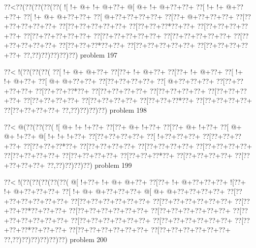 \vbox{\vbox{\goo
\0??<\0??(\0??(\0??(\0??(\0??(
\- ![\- !+\- @+\- !+\- @+\0??+
\- @[\- @+\- !+\- @+\0??+\0??+
\0??[\- !+\- !+\- @+\0??+\0??+
\0??[\- !+\- @+\- @+\0??+\0??+
\0??[\- @+\0??+\0??+\0??+\0??+
\0??[\0??+\- @+\0??+\0??+\0??+
\0??[\0??+\0??+\0??+\0??+\0??+
\0??[\0??+\0??+\0??+\0??+\0??+
\0??[\0??+\0??+\0??*\0??+\0??+
\0??[\0??+\0??+\0??+\0??+\0??+
\0??[\0??+\0??+\0??+\0??+\0??+
\0??[\0??+\0??+\0??+\0??+\0??+
\0??[\0??+\0??+\0??+\0??+\0??+
\0??[\0??+\0??+\0??+\0??+\0??+
\0??[\0??+\0??+\0??*\0??+\0??+
\0??[\0??+\0??+\0??+\0??+\0??+
\0??[\0??+\0??+\0??+\0??+\0??+
\0??,\0??)\0??)\0??)\0??)\0??)
}
\hfil problem 197\hfil\break
}

\vbox{\vbox{\goo
\0??<\- !(\0??(\0??(\0??(
\0??[\- !+\- @+\- @+\0??+
\0??[\0??+\- !+\- @+\0??+
\0??[\0??+\- !+\- @+\0??+
\0??[\- !+\- !+\- @+\0??+
\0??[\- @+\- @+\0??+\0??+
\0??[\0??+\0??+\0??+\0??+
\0??[\- @+\0??+\0??+\0??+
\0??[\0??+\0??+\0??+\0??+
\0??[\0??+\0??+\0??*\0??+
\0??[\0??+\0??+\0??+\0??+
\0??[\0??+\0??+\0??+\0??+
\0??[\0??+\0??+\0??+\0??+
\0??[\0??+\0??+\0??+\0??+
\0??[\0??+\0??+\0??+\0??+
\0??[\0??+\0??+\0??*\0??+
\0??[\0??+\0??+\0??+\0??+
\0??[\0??+\0??+\0??+\0??+
\0??,\0??)\0??)\0??)\0??)
}
\hfil problem 198\hfil\break
}

\vbox{\vbox{\goo
\0??<\- @(\0??(\0??(\0??(
\- ![\- @+\- !+\- !+\0??+
\0??[\0??+\- @+\- !+\0??+
\0??[\0??+\- @+\- !+\0??+
\0??[\- @+\- @+\- !+\0??+
\- @[\- !+\- !+\- !+\0??+
\0??[\0??+\0??+\0??+\0??+
\0??[\- !+\0??+\0??+\0??+
\0??[\0??+\0??+\0??+\0??+
\0??[\0??+\0??+\0??*\0??+
\0??[\0??+\0??+\0??+\0??+
\0??[\0??+\0??+\0??+\0??+
\0??[\0??+\0??+\0??+\0??+
\0??[\0??+\0??+\0??+\0??+
\0??[\0??+\0??+\0??+\0??+
\0??[\0??+\0??+\0??*\0??+
\0??[\0??+\0??+\0??+\0??+
\0??[\0??+\0??+\0??+\0??+
\0??,\0??)\0??)\0??)\0??)
}
\hfil problem 199\hfil\break
}

\vbox{\vbox{\goo
\0??<\- !(\0??(\0??(\0??(\0??(\0??(
\- @[\- !+\0??+\- !+\- @+\- @+\0??+
\0??[\0??+\- !+\- @+\0??+\0??+\0??+
\- ![\0??+\- !+\- @+\0??+\0??+\0??+
\0??[\- !+\- @+\- @+\0??+\0??+\0??+
\- @[\- @+\- @+\0??+\0??+\0??+\0??+
\0??[\0??+\0??+\0??+\0??+\0??+\0??+
\0??[\0??+\0??+\0??+\0??+\0??+\0??+
\0??[\0??+\0??+\0??+\0??+\0??+\0??+
\0??[\0??+\0??+\0??*\0??+\0??+\0??+
\0??[\0??+\0??+\0??+\0??+\0??+\0??+
\0??[\0??+\0??+\0??+\0??+\0??+\0??+
\0??[\0??+\0??+\0??+\0??+\0??+\0??+
\0??[\0??+\0??+\0??+\0??+\0??+\0??+
\0??[\0??+\0??+\0??+\0??+\0??+\0??+
\0??[\0??+\0??+\0??*\0??+\0??+\0??+
\0??[\0??+\0??+\0??+\0??+\0??+\0??+
\0??[\0??+\0??+\0??+\0??+\0??+\0??+
\0??,\0??)\0??)\0??)\0??)\0??)\0??)
}
\hfil problem 200\hfil\break
}

